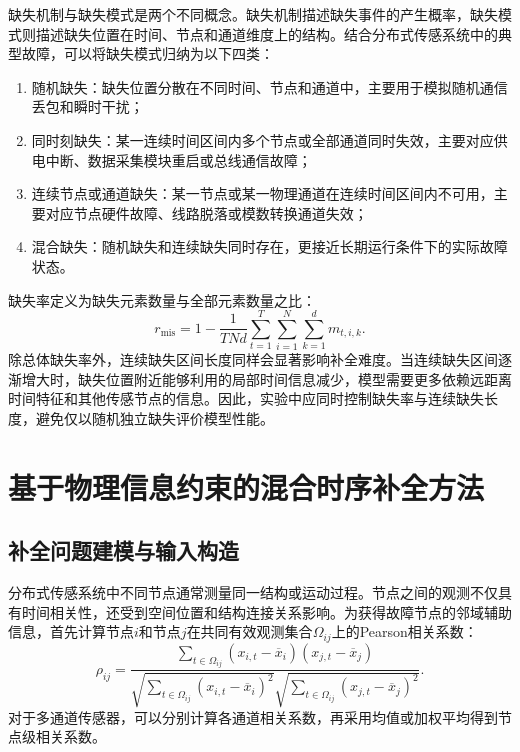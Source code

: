 缺失机制与缺失模式是两个不同概念。缺失机制描述缺失事件的产生概率，缺失模式则描述缺失位置在时间、节点和通道维度上的结构。结合分布式传感系统中的典型故障，可以将缺失模式归纳为以下四类：

\begin{enumerate}
    \item 随机缺失：缺失位置分散在不同时间、节点和通道中，主要用于模拟随机通信丢包和瞬时干扰；
    \item 同时刻缺失：某一连续时间区间内多个节点或全部通道同时失效，主要对应供电中断、数据采集模块重启或总线通信故障；
    \item 连续节点或通道缺失：某一节点或某一物理通道在连续时间区间内不可用，主要对应节点硬件故障、线路脱落或模数转换通道失效；
    \item 混合缺失：随机缺失和连续缺失同时存在，更接近长期运行条件下的实际故障状态。
\end{enumerate}

缺失率定义为缺失元素数量与全部元素数量之比：
\begin{equation}
    r_{\mathrm{mis}}
    =
    1-
    \frac{1}{TNd}
    \sum_{t=1}^{T}
    \sum_{i=1}^{N}
    \sum_{k=1}^{d}
    m_{t,i,k}.
\end{equation}
除总体缺失率外，连续缺失区间长度同样会显著影响补全难度。当连续缺失区间逐渐增大时，缺失位置附近能够利用的局部时间信息减少，模型需要更多依赖远距离时间特征和其他传感节点的信息。因此，实验中应同时控制缺失率与连续缺失长度，避免仅以随机独立缺失评价模型性能\cite{zhou2026benchmark}。

\section{基于物理信息约束的混合时序补全方法}

\subsection{补全问题建模与输入构造}

分布式传感系统中不同节点通常测量同一结构或运动过程。节点之间的观测不仅具有时间相关性，还受到空间位置和结构连接关系影响。为获得故障节点的邻域辅助信息，首先计算节点$i$和节点$j$在共同有效观测集合$\Omega_{ij}$上的Pearson相关系数：
\begin{equation}
    \rho_{ij}
    =
    \frac{
    \sum_{t\in\Omega_{ij}}
    (x_{i,t}-\overline{x}_i)
    (x_{j,t}-\overline{x}_j)
    }{
    \sqrt{
    \sum_{t\in\Omega_{ij}}
    (x_{i,t}-\overline{x}_i)^2
    }
    \sqrt{
    \sum_{t\in\Omega_{ij}}
    (x_{j,t}-\overline{x}_j)^2
    }
    }.
\end{equation}
对于多通道传感器，可以分别计算各通道相关系数，再采用均值或加权平均得到节点级相关系数。

